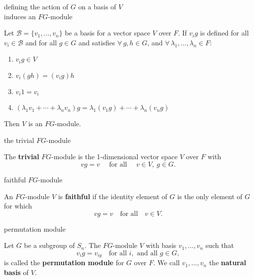\documentclass[avery5371,grid]{flashcards}
\newcommand{\B}{\mathscr{B}}
\newcommand{\defn}[1]{\textbf{#1}}
\begin{document}
\begin{flashcard}[Proposition 4.6]{defining the action of $G$ on a basis of $V$\\
  induces an $FG$-module}

  Let $\B=\{v_1, \ldots , v_n\}$ be a basis for a vector space $V$
  over $F$. If $v_i g$ is defined for all $v_i \in \B$ and for all
  $g\in G$ and satisfies $\forall \, g, h\in G$, and
  $\forall \, \lambda_1, \ldots, \lambda_n \in F$:
  \begin{enumerate}
  \item $v_i g \in V$
  \item $v_i(gh) = (v_i g)h$
  \item $v_i 1 = v_i$
  \item $(\lambda_1 v_1 + \cdots + \lambda_n v_n)g =
    \lambda_1(v_1 g) + \cdots + \lambda_n (v_n g)$
  \end{enumerate}
  Then $V$ is an $FG$-module.

\end{flashcard}

\begin{flashcard}[Definition]{the trivial $FG$-module}

  The \defn{trivial} $FG$-module is the 1-dimensional vector space $V$
  over $F$ with
  \[
    vg = v \quad \text{ for all } \quad v\in V, \: g\in G.
  \]

\end{flashcard}

\begin{flashcard}[Definition]{faithful $FG$-module}

  An $FG$-module $V$ is \defn{faithful} if the identity element of $G$
  is the only element of $G$ for which
  \[
    vg = v \quad \text{for all} \quad v\in V.
  \]

\end{flashcard}

\begin{flashcard}[Definition]{permutation module}

  Let $G$ be a subgroup of $S_n$. The $FG$-module $V$ with basis
  $v_1, \ldots, v_n$ such that
  \[
    v_i g = v_{ig} \quad \text{for all } i, \text{ and all } g\in G,
  \]
  is called the \defn{permutation module} for $G$ over $F$. We call
  $v_1, \ldots, v_n$ the \defn{natural basis} of $V$.

\end{flashcard}



\end{document}
